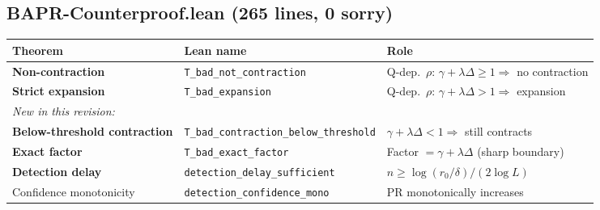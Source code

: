 \subsection{BAPR-Counterproof.lean (265 lines, \textbf{0 sorry})}
\begin{center}
\begin{tabular}{lll}
\toprule
\textbf{Theorem} & \textbf{Lean name} & \textbf{Role} \\
\midrule
\textbf{Non-contraction} & \texttt{T\_bad\_not\_contraction} & Q-dep.\ $\rho$: $\gamma{+}\lambda\Delta \geq 1 \Rightarrow$ no contraction \\
\textbf{Strict expansion} & \texttt{T\_bad\_expansion} & Q-dep.\ $\rho$: $\gamma{+}\lambda\Delta > 1 \Rightarrow$ expansion \\
\midrule
\multicolumn{3}{l}{\textit{New in this revision:}} \\
\textbf{Below-threshold contraction} & \texttt{T\_bad\_contraction\_below\_threshold} & $\gamma{+}\lambda\Delta < 1 \Rightarrow$ still contracts \\
\textbf{Exact factor} & \texttt{T\_bad\_exact\_factor} & Factor $= \gamma{+}\lambda\Delta$ (sharp boundary) \\
\midrule
\textbf{Detection delay} & \texttt{detection\_delay\_sufficient} & $n \geq \log(r_0/\delta)/(2\log L)$ \\
Confidence monotonicity & \texttt{detection\_confidence\_mono} & PR monotonically increases \\
\bottomrule
\end{tabular}
\end{center}


